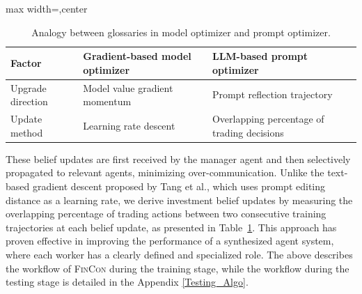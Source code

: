 \begin{table}[ht]
\centering
\begin{adjustbox}{max width=\dimexpr\columnwidth,center}
\begin{tabular}{l|l|l}
\toprule
\textbf{Factor} & \textbf{Gradient-based model optimizer} & \textbf{LLM-based prompt optimizer}  \\
\midrule
Upgrade direction
    & Model value gradient momentum & Prompt reflection trajectory  \\
\midrule
Update method 
    & Learning rate descent & Overlapping percentage of trading decisions \\
\bottomrule
\end{tabular}
\end{adjustbox}
\caption{\footnotesize{Analogy between glossaries in model optimizer and prompt optimizer.}}
\label{CVRF_compare}
\end{table}

These belief updates are first received by the manager agent and then selectively propagated to relevant agents, minimizing over-communication. Unlike the text-based gradient descent proposed by Tang et al.\cite{tang2024unleashing}, which uses prompt editing distance as a learning rate, we derive investment belief updates by measuring the overlapping percentage of trading actions between two consecutive training trajectories at each belief update, as presented in Table~\ref{CVRF_compare}. This approach has proven effective in improving the performance of a synthesized agent system, where each worker has a clearly defined and specialized role. The above describes the workflow of \textsc{FinCon} during the training stage, while the workflow during the testing stage is detailed in the Appendix \ref{Testing_Algo}.


